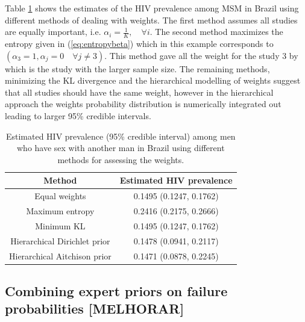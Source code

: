 \documentclass[a4paper, notitlepage, 10pt]{article}
\begin{document}
Table \ref{tab:probMeta} shows the estimates of the HIV prevalence among MSM in Brazil using different methods of dealing with weights. 
The first method assumes all studies are equally important, i.e. $\alpha_i = \frac{1}{K}, \quad \forall i$. The second method maximizes the entropy given in (\ref{eq:entropybeta}) which in this example corresponds to $(\alpha_3 = 1, \alpha_j = 0 \quad \forall j \neq 3)$. 
This method gave all the weight for the study 3 by \cite{sutmoller2002human} which is the study with the larger sample size. 
The remaining methods, minimizing the KL divergence and the hierarchical modelling of weights suggest that all studies should have the same weight, however in the hierarchical approach the weights probability distribution is numerically integrated out leading to larger 95\% credible intervals. 
\begin{table}[ht]
\caption{Estimated HIV prevalence (95\% credible interval) among men who have sex with another man in Brazil using different methods for assessing the weights.}
\centering
\label{tab:probMeta}
\begin{tabular}{cc}
 \hline
Method & Estimated HIV prevalence \\ 
 \hline
 Equal weights                & 0.1495 (0.1247, 0.1762) \\ 
 Maximum entropy              & 0.2416 (0.2175, 0.2666) \\ 
 Minimum KL                   & 0.1495 (0.1247, 0.1762) \\ 
 Hierarchical Dirichlet prior & 0.1478 (0.0941, 0.2117) \\ 
 Hierarchical Aitchison prior & 0.1471 (0.0878, 0.2245) \\ 
  \hline
\end{tabular}
\end{table}

\subsection{Combining expert priors on failure probabilities [MELHORAR]}
\label{sec:posteriorProbs}
\end{document}
